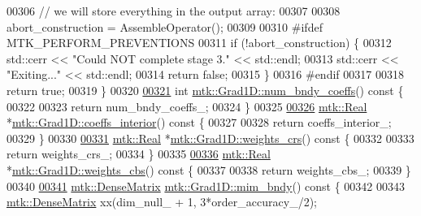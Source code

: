 \begin{DoxyCode}
{{00306   \textcolor{comment}{// we will store everything in the output array:}
00307 
00308   abort\_construction = AssembleOperator();
00309 
00310 \textcolor{preprocessor}{  #ifdef MTK\_PERFORM\_PREVENTIONS}
00311   \textcolor{keywordflow}{if} (!abort\_construction) \{
00312     std::cerr << \textcolor{stringliteral}{"Could NOT complete stage 3."} << std::endl;
00313     std::cerr << \textcolor{stringliteral}{"Exiting..."} << std::endl;
00314     \textcolor{keywordflow}{return} \textcolor{keyword}{false};
00315   \}
00316 \textcolor{preprocessor}{  #endif}
00317 
00318   \textcolor{keywordflow}{return} \textcolor{keyword}{true};
00319 \}
00320 
\hypertarget{mtk__grad__1d_8cc_source_l00321}{}\hyperlink{classmtk_1_1Grad1D_a7168205c21ba00012558f8bba069c119}{00321} \textcolor{keywordtype}{int} \hyperlink{classmtk_1_1Grad1D_a7168205c21ba00012558f8bba069c119}{mtk::Grad1D::num\_bndy\_coeffs}()\textcolor{keyword}{ const }\{
00322 
00323   \textcolor{keywordflow}{return} num\_bndy\_coeffs\_;
00324 \}
00325 
\hypertarget{mtk__grad__1d_8cc_source_l00326}{}\hyperlink{classmtk_1_1Grad1D_a88735f8d2a6ed986370dc3caeb84959b}{00326} \hyperlink{group__c01-roots_gac080bbbf5cbb5502c9f00405f894857d}{mtk::Real} *\hyperlink{classmtk_1_1Grad1D_a88735f8d2a6ed986370dc3caeb84959b}{mtk::Grad1D::coeffs\_interior}()\textcolor{keyword}{ const }\{
00327 
00328   \textcolor{keywordflow}{return} coeffs\_interior\_;
00329 \}
00330 
\hypertarget{mtk__grad__1d_8cc_source_l00331}{}\hyperlink{classmtk_1_1Grad1D_ae5f15d8986a5680b6a1c120283c6cc5e}{00331} \hyperlink{group__c01-roots_gac080bbbf5cbb5502c9f00405f894857d}{mtk::Real} *\hyperlink{classmtk_1_1Grad1D_ae5f15d8986a5680b6a1c120283c6cc5e}{mtk::Grad1D::weights\_crs}()\textcolor{keyword}{ const }\{
00332 
00333   \textcolor{keywordflow}{return} weights\_crs\_;
00334 \}
00335 
\hypertarget{mtk__grad__1d_8cc_source_l00336}{}\hyperlink{classmtk_1_1Grad1D_ad11927d8f9f1ca0089aaa2be7094f7f3}{00336} \hyperlink{group__c01-roots_gac080bbbf5cbb5502c9f00405f894857d}{mtk::Real} *\hyperlink{classmtk_1_1Grad1D_ad11927d8f9f1ca0089aaa2be7094f7f3}{mtk::Grad1D::weights\_cbs}()\textcolor{keyword}{ const }\{
00337 
00338   \textcolor{keywordflow}{return} weights\_cbs\_;
00339 \}
00340 
\hypertarget{mtk__grad__1d_8cc_source_l00341}{}\hyperlink{classmtk_1_1Grad1D_ab25e1d064a5a00fbe3777e65fd5750c0}{00341} \hyperlink{classmtk_1_1DenseMatrix}{mtk::DenseMatrix} \hyperlink{classmtk_1_1Grad1D_ab25e1d064a5a00fbe3777e65fd5750c0}{mtk::Grad1D::mim\_bndy}()\textcolor{keyword}{ const }\{
00342 
00343   \hyperlink{classmtk_1_1DenseMatrix}{mtk::DenseMatrix} xx(dim\_null\_ + 1, 3*order\_accuracy\_/2);
}}
\end{DoxyCode}
